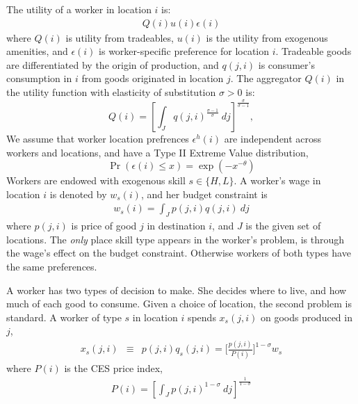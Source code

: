 \documentclass[12 pt]{article}
\begin{document}
The utility of a worker in location $i$ is:
\begin{eqnarray}\label{eq:utility}
	Q(i) u(i) \epsilon(i)
\end{eqnarray} 
where $Q(i)$ is utility from tradeables, $u(i)$ is the utility from exogenous amenities, and $\epsilon(i)$ is worker-specific preference for location $i$.  Tradeable goods are differentiated by the origin of production, and $q(j,i)$ is consumer's consumption in $i$ from goods originated in location $j$. The aggregator $Q(i)$ in the utility function with elasticity of substitution $\sigma>0$ is:
\[
	Q(i) = \left[\int_J q(j,i)^{\frac{ \sigma - 1}{\sigma}}~ dj\right]^{\frac{\sigma}{\sigma-1}},
\]
We assume that worker location prefrences $\epsilon^h(i)$ are independent across workers and locations, and have a Type II Extreme Value distribution,
\[
    \Pr(\epsilon(i) \leq x) = \exp(-x^{-\theta})
\]
Workers are endowed with exogenous skill $s \in \{H,L\}$. A worker's wage in location $i$ is denoted by $w_s(i)$, and her budget constraint is 
\begin{eqnarray}\label{eq:budget}
	w_s(i) = \int_J p(j,i)q(j,i)~dj 
\end{eqnarray}
where $p(j,i)$ is price of good $j$ in destination $i$, and $J$ is the given set of locations.  The \emph{only} place skill type appears in the worker's problem, is through the wage's effect on the budget constraint.  Otherwise workers of both types have the same preferences.

A worker has two types of decision to make.  She decides where to live, and how much of each good to consume.  Given a choice of location, the second problem is standard.  A worker of type $s$ in location $i$ spends $x_s(j,i)$ on goods produced in $j$,
\begin{eqnarray}\label{eq:x_s}
	x_s(j,i) & \equiv & p(j,i) q_s(j,i) = \Big[ \frac{p(j,i)}{P(i)} \Big]^{1-\sigma} w_s
\end{eqnarray}
where $P(i)$ is the CES price index,
\begin{eqnarray}\label{eq:price_index}
	P(i) = \left[\int_J p(j,i)^{1-\sigma}~ dj\right]^{\frac{1}{1-\sigma}}
\end{eqnarray}
\end{document}
